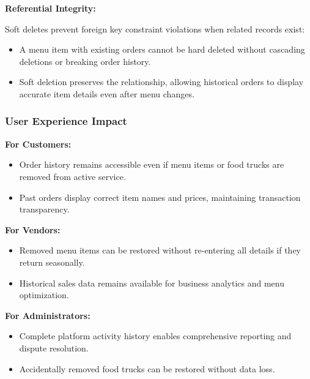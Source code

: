 \documentclass[12pt,a4paper]{article}
\begin{document}
\begin{tcolorbox}[colback=primaryblue!5, colframe=primaryblue, boxrule=1pt, arc=3pt, left=10pt, right=10pt, top=8pt, bottom=8pt]
\vspace{0.5em}

\textbf{Referential Integrity:}

Soft deletes prevent foreign key constraint violations when related records exist:

\begin{itemize}[leftmargin=2em, itemsep=6pt]
    \item A menu item with existing orders cannot be hard deleted without cascading deletions or breaking order history.
    \item Soft deletion preserves the relationship, allowing historical orders to display accurate item details even after menu changes.
\end{itemize}

\subsubsection{User Experience Impact}

\textbf{For Customers:}
\begin{itemize}[leftmargin=2em, itemsep=6pt]
    \item Order history remains accessible even if menu items or food trucks are removed from active service.
    \item Past orders display correct item names and prices, maintaining transaction transparency.
\end{itemize}

\vspace{0.5em}

\textbf{For Vendors:}
\begin{itemize}[leftmargin=2em, itemsep=6pt]
    \item Removed menu items can be restored without re-entering all details if they return seasonally.
    \item Historical sales data remains available for business analytics and menu optimization.
\end{itemize}

\vspace{0.5em}

\textbf{For Administrators:}
\begin{itemize}[leftmargin=2em, itemsep=6pt]
    \item Complete platform activity history enables comprehensive reporting and dispute resolution.
    \item Accidentally removed food trucks can be restored without data loss.
\end{itemize}


\end{tcolorbox}
\end{document}
